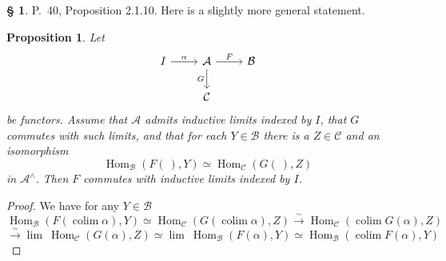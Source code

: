 \documentclass[12pt]{article}%
\newtheorem{prop}[thm]{Proposition}
\theoremstyle{remark}
\theoremstyle{definition}
\newtheorem{s}[thm]{\S}%
\newcommand{\A}{\mathcal A}
\newcommand{\B}{\mathcal B}
\newcommand{\C}{\mathcal C}
\newcommand{\xr}{\xrightarrow}
\DeclareMathOperator*{\colim}{colim}
\DeclareMathOperator{\Hom}{Hom}%
\begin{document}
%

\begin{s} 
P.~40, Proposition 2.1.10. Here is a slightly more general statement. 
%
\begin{prop}\label{2.1.10}
Let 
$$
\begin{tikzcd}
I\ar{r}{\alpha}&\A\ar{d}[swap]{G}\ar{r}{F}&\B\\
&\C
\end{tikzcd}
$$
be functors. Assume that $\A$ admits inductive limits indexed by $I$, that $G$ commutes with such limits, and that for each $Y\in\B$ there is a $Z\in\C$ and an isomorphism 
$$
\Hom_\B(F(\ ),Y)\simeq\Hom_\C(G(\ ),Z)
$$
in $\A^\wedge$. Then $F$ commutes with inductive limits indexed by $I$.
\end{prop}
%
\begin{proof}
We have for any $Y\in\B$ 
$$ 
\Hom_\B\left(F\left(\colim\alpha\right),Y\right)\simeq
\Hom_\C\left(G\left(\colim\alpha\right),Z\right)
\xr\sim
\Hom_\C\left(\colim G(\alpha),Z\right)
$$
$$
\xr\sim\lim \ \Hom_\C(G(\alpha),Z)\simeq\lim \ \Hom_\B(F(\alpha),Y)\simeq\Hom_\B(\colim F(\alpha),Y)
$$
\end{proof}
\end{s}
%
%
\end{document}
